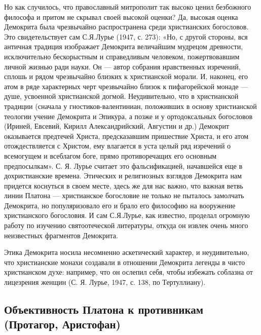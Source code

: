 Но как случилось, что православный митрополит так высоко ценил
безбожного философа и притом не скрывал своей высокой оценки? Да,
высокая оценка Демокрита была чрезвычайно распространена среди
христианских богословов. Это свидетельствует сам С.Я.Лурье (1947, с.
273): «Но, с другой стороны, вся античная традиция изображает
Демокрита величайшим мудрецом древности, исключительно бескорыстным и
справедливым человеком, пожертвовавшим личной жизнью ради науки. Он
--- автор собрания нравственных изречений, сплошь и рядом чрезвычайно
близких к христианской морали. И, наконец, его атом в ряде характерных
черт чрезвычайно близок к пифагорейской монаде --- душе, усвоенной
христианской догмой. Неудивительно, что в христианской традиции
(сначала у гностиков-валентиниан, положивших в основу христианской
теологии учение Демокрита и Эпикура, а позже и у ортодоксальных
богословов (Ириней, Евсевий, Кирилл Александрийский, Августин и др.)
Демокрит оказывается предтечей Христа, предсказавшим пришествие
Христа, и его атом отождествляется с Христом, ему влагается в уста
целый ряд изречений о всемогущем и всеблагом боге, прямо
противоречащих его основным предпосылкам». С. Я. Лурье считает это
фальсификацией, начавшейся еще в дохристианские времена. Этических и
религиозных взглядов Демокрита нам придется коснуться в своем месте,
здесь же для нас важно, что важная ветвь линии Платона ---
христианское богословие не только не пыталось замолчать Демокрита, но
популяризовало его и брало его философию на вооружение христианского
богословия. И сам С.Я.Лурье, как известно, проделал огромную работу по
изучению святоотеческой литературы, откуда он извлек очень много
неизвестных фрагментов Демокрита.

Этика Демокрита носила несомненно аскетический характер, и
неудивительно, что христианские монахи создавали в отношении Демокрита
легенды в чисто христианском духе: например, что он ослепил себя,
чтобы избежать соблазна от лицезрения женщин (С. Я. Лурье, 1947, с.
138, по Тертуллиану).

\subsection{Объективность Платона к противникам (Протагор, Аристофан)}

